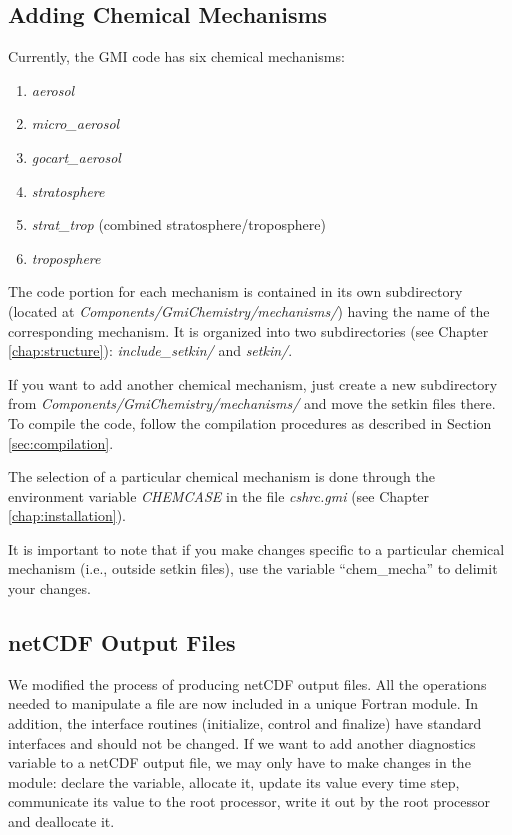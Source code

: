 \subsection{Adding Chemical Mechanisms}
%
Currently, the GMI code has six chemical mechanisms:
\begin{enumerate}
\item {\em aerosol}
\item {\em micro\_aerosol}
\item {\em gocart\_aerosol}
\item {\em stratosphere}
\item {\em strat\_trop} (combined stratosphere/troposphere)
\item {\em troposphere}
\end{enumerate}
%
The code portion for each mechanism is contained in its own subdirectory 
(located at {\em Components/GmiChemistry/mechanisms/}) having the name of the corresponding 
mechanism.
It is organized into two subdirectories (see Chapter \ref{chap:structure}):
{\em include\_setkin/} and {\em setkin/}. 

If you want to add another chemical mechanism, just create a new subdirectory
from {\em Components/GmiChemistry/mechanisms/} and move the setkin files there.
To compile the code, follow the compilation procedures as described in Section
\ref{sec:compilation}.

The selection of a particular chemical mechanism is done through the 
environment variable {\em CHEMCASE} in the file {\em cshrc.gmi} 
(see Chapter \ref{chap:installation}).

\begin{remark}
It is important to note that if you make changes specific to a particular
chemical mechanism (i.e., outside setkin files), use the variable 
``chem\_mecha'' to delimit your changes.
\end{remark}

\subsection{netCDF Output Files}
We modified the process of producing netCDF output files.
All the operations needed to manipulate a file are now included in a unique
Fortran module.
In addition, the interface routines (initialize, control and finalize)
have standard interfaces and should not be changed.
If we want to add another diagnostics variable to a netCDF output file,
we may only have to make changes in the module: declare the variable,
allocate it, update its value every time step, communicate its value to
the root processor, write it out by the root processor and deallocate 
it.

